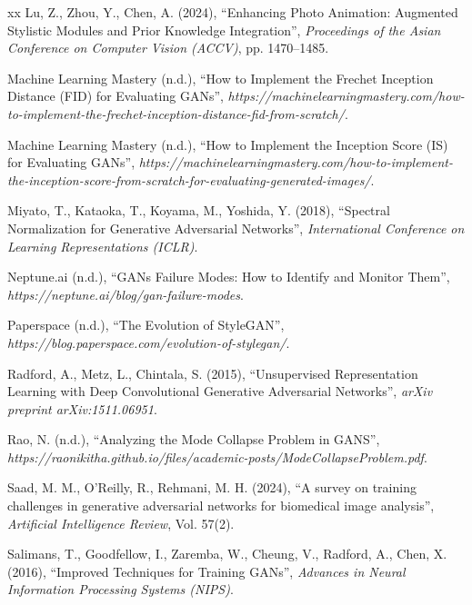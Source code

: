 \begin{thebibliography}{xx}
Lu, Z., Zhou, Y., Chen, A. (2024), ``Enhancing Photo Animation: Augmented Stylistic Modules and Prior Knowledge Integration'', {\em Proceedings of the Asian Conference on Computer Vision (ACCV)}, pp. 1470–1485.

Machine Learning Mastery (n.d.), ``How to Implement the Frechet Inception Distance (FID) for Evaluating GANs'', {\em https://machinelearningmastery.com/how-to-implement-the-frechet-inception-distance-fid-from-scratch/}.

Machine Learning Mastery (n.d.), ``How to Implement the Inception Score (IS) for Evaluating GANs'', {\em https://machinelearningmastery.com/how-to-implement-the-inception-score-from-scratch-for-evaluating-generated-images/}.

Miyato, T., Kataoka, T., Koyama, M., Yoshida, Y. (2018), ``Spectral Normalization for Generative Adversarial Networks'', {\em International Conference on Learning Representations (ICLR)}.

Neptune.ai (n.d.), ``GANs Failure Modes: How to Identify and Monitor Them'', {\em https://neptune.ai/blog/gan-failure-modes}.

Paperspace (n.d.), ``The Evolution of StyleGAN'', {\em https://blog.paperspace.com/evolution-of-stylegan/}.

Radford, A., Metz, L., Chintala, S. (2015), ``Unsupervised Representation Learning with Deep Convolutional Generative Adversarial Networks'', {\em arXiv preprint arXiv:1511.06951}.

Rao, N. (n.d.), ``Analyzing the Mode Collapse Problem in GANS'', {\em https://raonikitha.github.io/files/academic-posts/ModeCollapseProblem.pdf}.

Saad, M. M., O'Reilly, R., Rehmani, M. H. (2024), ``A survey on training challenges in generative adversarial networks for biomedical image analysis'', {\em Artificial Intelligence Review}, Vol. 57(2).

Salimans, T., Goodfellow, I., Zaremba, W., Cheung, V., Radford, A., Chen, X. (2016), ``Improved Techniques for Training GANs'', {\em Advances in Neural Information Processing Systems (NIPS)}.


\end{thebibliography}
